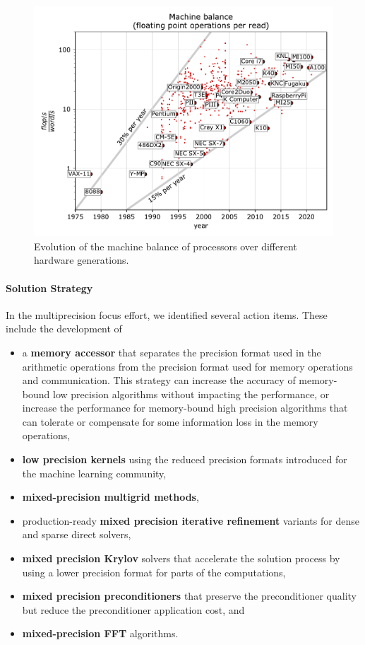 \begin{figure}[htb]
	\centering
	\includegraphics[width=.8\columnwidth]{projects/2.3.3-MathLibs/2.3.3.01-xSDK/xsdk-machinebalance.pdf}
	\caption{\label{fig:xsdk-machinebalance} Evolution of the machine balance of processors over different hardware generations.}
\end{figure}


\paragraph{Solution Strategy}
In the multiprecision focus effort, we identified several action items. These include the development of
\begin{itemize}
\item a \textbf{memory accessor} that separates the precision format used in the arithmetic operations from the precision format used for memory operations and communication. This strategy can increase the accuracy of memory-bound low precision algorithms without impacting the performance, or increase the performance for memory-bound high precision algorithms that can tolerate or compensate for some information loss in the memory operations,
\item \textbf{low precision kernels} using the reduced precision formats introduced for the machine learning community,
\item \textbf{mixed-precision multigrid methods},
\item production-ready \textbf{mixed precision iterative refinement} variants for dense and sparse direct solvers,
\item \textbf{mixed precision Krylov} solvers that accelerate the solution process by using a lower precision format for parts of the computations,
\item \textbf{mixed precision preconditioners} that preserve the preconditioner quality but reduce the preconditioner application cost, and
\item \textbf{mixed-precision FFT} algorithms.
\end{itemize}

